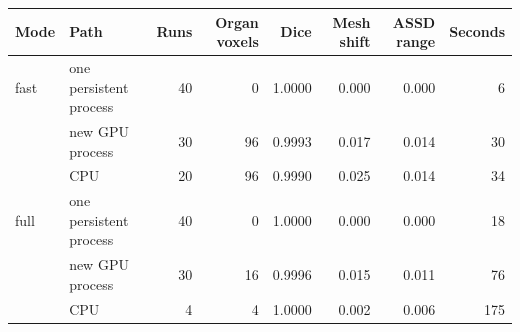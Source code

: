 \begin{tabular}{llrrrrrr}
\toprule
Mode & Path & Runs & Organ voxels & Dice & Mesh shift & ASSD range & Seconds \\
\midrule
fast & one persistent process & 40 & 0 & 1.0000 & 0.000 & 0.000 & 6 \\
 & new GPU process & 30 & 96 & 0.9993 & 0.017 & 0.014 & 30 \\
 & CPU & 20 & 96 & 0.9990 & 0.025 & 0.014 & 34 \\
full & one persistent process & 40 & 0 & 1.0000 & 0.000 & 0.000 & 18 \\
 & new GPU process & 30 & 16 & 0.9996 & 0.015 & 0.011 & 76 \\
 & CPU & 4 & 4 & 1.0000 & 0.002 & 0.006 & 175 \\
\bottomrule
\end{tabular}

